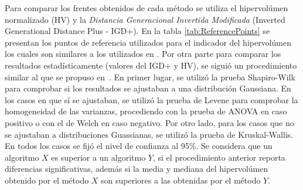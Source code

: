 Para comparar los frentes obtenidos de cada método se utiliza el hipervolúmen normalizado (HV) y la \textit{Distancia Generacional Invertida Modificada} (Inverted Generational Distance Plus - IGD+).
%
En la tabla \ref{tab:ReferencePoints} se presentan los puntos de referencia utilizados para el indicador del hipervolúmen los cuales son similares a los utilizados en \cite{Joel:Kuhn_Munkres, Joel:OperatorAHX}.
%
Por otra parte para comparar los resultados estadísticamente (valores del IGD+ y HV), se siguió un procedimiento similar al que se propuso en~\cite{Joel:StatisticalTest}.
%
En primer lugar, se utilizó la prueba Shapiro-Wilk para comprobar si los resultados se ajustaban a una distribución Gaussiana. 
%
%
En los casos en que sí se ajustaban, se utilizó la prueba de Levene para comprobar la homogeneidad de las varianzas, procediendo con la prueba de ANOVA en caso positivo o con el de Welch en caso negativo.
%
%
Por otro lado, para los casos que no se ajustaban a distribuciones Guassianas, se utilizó la prueba de Kruskal-Wallis.
%
En todos los casos se fijó el nivel de confianza al 95\%.
%
Se considera que un algoritmo $X$ es superior a un algoritmo $Y$, si el procedimiento anterior reporta diferencias significativas, además si la media y mediana del hipervolúmen obtenido por el método $X$ son superiores a las obtenidas por el método $Y$.
%


